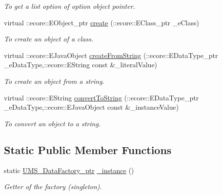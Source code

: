 \begin{DoxyCompactItemize}
\begin{DoxyCompactList}\small\item\em To get a list option of option object pointer. \item\end{DoxyCompactList}\item 
virtual ::ecore::EObject\_\-ptr \hyperlink{classUMS__Data_1_1UMS__DataFactory_a538e8d38f6df17c7c255b2164452acd4}{create} (::ecore::EClass\_\-ptr \_\-eClass)
\begin{DoxyCompactList}\small\item\em To create an object of a class. \item\end{DoxyCompactList}\item 
virtual ::ecore::EJavaObject \hyperlink{classUMS__Data_1_1UMS__DataFactory_a75f4d8d9052c7c744bc4793c4f7928e1}{createFromString} (::ecore::EDataType\_\-ptr \_\-eDataType,::ecore::EString const \&\_\-literalValue)
\begin{DoxyCompactList}\small\item\em To create an object from a string. \item\end{DoxyCompactList}\item 
virtual ::ecore::EString \hyperlink{classUMS__Data_1_1UMS__DataFactory_abb60f0f91e384f676d920600fd28da0a}{convertToString} (::ecore::EDataType\_\-ptr \_\-eDataType,::ecore::EJavaObject const \&\_\-instanceValue)
\begin{DoxyCompactList}\small\item\em To convert an object to a string. \item\end{DoxyCompactList}\end{DoxyCompactItemize}
\subsection*{Static Public Member Functions}
\begin{DoxyCompactItemize}
\item 
\hypertarget{classUMS__Data_1_1UMS__DataFactory_a73ad8709225ab46ad5ef5e172e0e8a0a}{
static \hyperlink{classUMS__Data_1_1UMS__DataFactory}{UMS\_\-DataFactory\_\-ptr} \hyperlink{classUMS__Data_1_1UMS__DataFactory_a73ad8709225ab46ad5ef5e172e0e8a0a}{\_\-instance} ()}
\label{classUMS__Data_1_1UMS__DataFactory_a73ad8709225ab46ad5ef5e172e0e8a0a}

\begin{DoxyCompactList}\small\item\em Getter of the factory (singleton). \item\end{DoxyCompactList}\end{DoxyCompactItemize}
